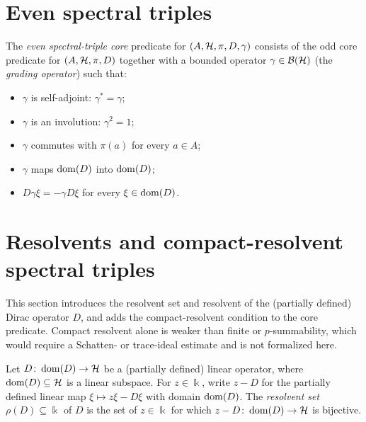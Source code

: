 \section{Even spectral triples}
\label{sec:even-spectral-triples}

\begin{definition}
  \label{def:even-spectral-triple}
  \leanok
  The \emph{even spectral-triple core} predicate for $(A, \mathcal{H}, \pi, D, \gamma)$ consists of
  the odd core predicate for $(A, \mathcal{H}, \pi, D)$ together with a bounded operator
  $\gamma \in \mathcal{B}(\mathcal{H})$ (the \emph{grading operator}) such that:
  \begin{itemize}
    \item $\gamma$ is self-adjoint: $\gamma^* = \gamma$;
    \item $\gamma$ is an involution: $\gamma^2 = 1$;
    \item $\gamma$ commutes with $\pi(a)$ for every $a \in A$;
    \item $\gamma$ maps $\operatorname{dom}(D)$ into $\operatorname{dom}(D)$;
    \item $D \gamma \xi = -\gamma D \xi$ for every $\xi \in \operatorname{dom}(D)$.
  \end{itemize}
\end{definition}

\section{Resolvents and compact-resolvent spectral triples}
\label{sec:resolvents}

This section introduces the resolvent set and resolvent of the (partially defined) Dirac
operator $D$, and adds the compact-resolvent condition to the core predicate.  Compact
resolvent alone is weaker than finite or $p$-summability, which would require a Schatten- or
trace-ideal estimate and is not formalized here.

\begin{definition}
  \label{def:resolvent-set}
  \leanok
  Let $D \colon \operatorname{dom}(D) \to \mathcal{H}$ be a (partially defined) linear operator, where
  $\operatorname{dom}(D) \subseteq \mathcal{H}$ is a linear subspace. For $z \in \Bbbk$, write $z - D$ for the
  partially defined linear map $\xi \mapsto z\xi - D\xi$ with domain $\operatorname{dom}(D)$. The
  \emph{resolvent set} $\rho(D) \subseteq \Bbbk$ of $D$ is the set of $z \in \Bbbk$ for which
  $z - D \colon \operatorname{dom}(D) \to \mathcal{H}$ is bijective.
\end{definition}

